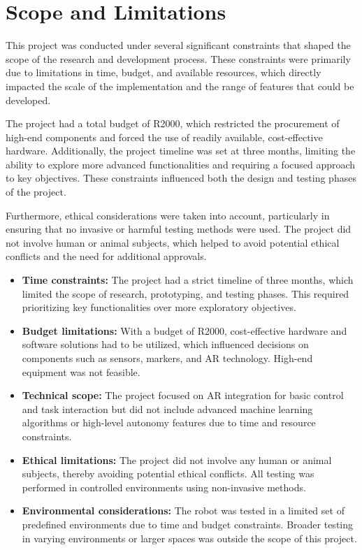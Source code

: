 
\section{\label{sec:scope}Scope and Limitations}

This project was conducted under several significant constraints that shaped the scope of the research and development process. These constraints were primarily due to limitations in time, budget, and available resources, which directly impacted the scale of the implementation and the range of features that could be developed.

The project had a total budget of R2000, which restricted the procurement of high-end components and forced the use of readily available, cost-effective hardware. Additionally, the project timeline was set at three months, limiting the ability to explore more advanced functionalities and requiring a focused approach to key objectives. These constraints influenced both the design and testing phases of the project.

Furthermore, ethical considerations were taken into account, particularly in ensuring that no invasive or harmful testing methods were used. The project did not involve human or animal subjects, which helped to avoid potential ethical conflicts and the need for additional approvals.

\begin{itemize}
    \item \textbf{Time constraints:} The project had a strict timeline of three months, which limited the scope of research, prototyping, and testing phases. This required prioritizing key functionalities over more exploratory objectives.
    \item \textbf{Budget limitations:} With a budget of R2000, cost-effective hardware and software solutions had to be utilized, which influenced decisions on components such as sensors, markers, and AR technology. High-end equipment was not feasible.
    \item \textbf{Technical scope:} The project focused on AR integration for basic control and task interaction but did not include advanced machine learning algorithms or high-level autonomy features due to time and resource constraints.
    \item \textbf{Ethical limitations:} The project did not involve any human or animal subjects, thereby avoiding potential ethical conflicts. All testing was performed in controlled environments using non-invasive methods.
    \item \textbf{Environmental considerations:} The robot was tested in a limited set of predefined environments due to time and budget constraints. Broader testing in varying environments or larger spaces was outside the scope of this project.
\end{itemize}

